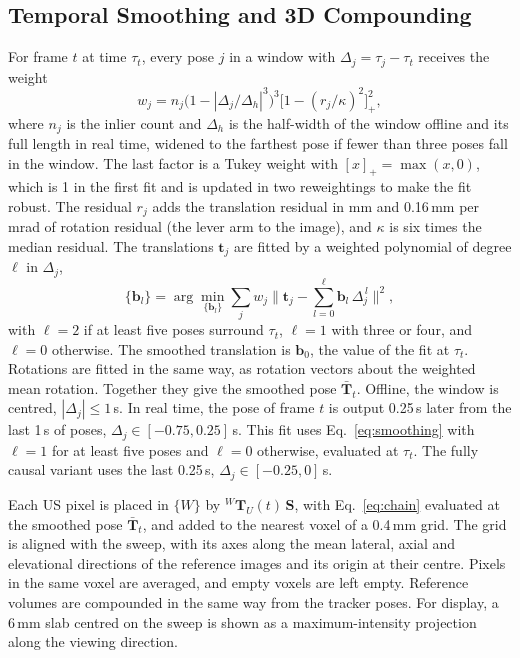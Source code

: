 \documentclass[9pt,shortpaper,twoside,web]{ieeecolor2}
\newcommand{\Tf}[2]{{}^{#1}\mathbf{T}_{#2}}
\begin{document}
\subsection{Temporal Smoothing and 3D Compounding}
\label{sec:smoothing}
For frame $t$ at time $\tau_t$, every pose $j$ in a window with $\Delta_j=\tau_j-\tau_t$ receives the weight
\begin{equation}
  w_j=n_j\big(1-|\Delta_j/\Delta_h|^3\big)^3\big[1-(r_j/\kappa)^2\big]_+^2 ,
  \label{eq:weights}
\end{equation}
where $n_j$ is the inlier count and $\Delta_h$ is the half-width of the window offline and its full length in real time, widened to the farthest pose if fewer than three poses fall in the window. The last factor is a Tukey weight with $[x]_+=\max(x,0)$, which is 1 in the first fit and is updated in two reweightings to make the fit robust. The residual $r_j$ adds the translation residual in mm and 0.16\,mm per mrad of rotation residual (the lever arm to the image), and $\kappa$ is six times the median residual. The translations $\mathbf{t}_j$ are fitted by a weighted polynomial of degree $\ell$ in $\Delta_j$,
\begin{equation}
  \{\mathbf{b}_l\}=\arg\min_{\{\mathbf{b}_l\}}\sum_j w_j\Big\|\mathbf{t}_j-\sum_{l=0}^{\ell}\mathbf{b}_l\,\Delta_j^{\,l}\Big\|^2 ,
  \label{eq:smoothing}
\end{equation}
with $\ell=2$ if at least five poses surround $\tau_t$, $\ell=1$ with three or four, and $\ell=0$ otherwise. The smoothed translation is $\mathbf{b}_0$, the value of the fit at $\tau_t$. Rotations are fitted in the same way, as rotation vectors about the weighted mean rotation. Together they give the smoothed pose $\bar{\mathbf{T}}_t$. Offline, the window is centred, $|\Delta_j|\le1$\,s. In real time, the pose of frame $t$ is output 0.25\,s later from the last 1\,s of poses, $\Delta_j\in[-0.75,0.25]$\,s. This fit uses Eq.~\eqref{eq:smoothing} with $\ell=1$ for at least five poses and $\ell=0$ otherwise, evaluated at $\tau_t$. The fully causal variant uses the last 0.25\,s, $\Delta_j\in[-0.25,0]$\,s.

Each US pixel is placed in $\{W\}$ by $\Tf{W}{U}(t)\,\mathbf{S}$, with Eq.~\eqref{eq:chain} evaluated at the smoothed pose $\bar{\mathbf{T}}_t$, and added to the nearest voxel of a 0.4\,mm grid. The grid is aligned with the sweep, with its axes along the mean lateral, axial and elevational directions of the reference images and its origin at their centre. Pixels in the same voxel are averaged, and empty voxels are left empty. Reference volumes are compounded in the same way from the tracker poses. For display, a 6\,mm slab centred on the sweep is shown as a maximum-intensity projection along the viewing direction.
\end{document}
